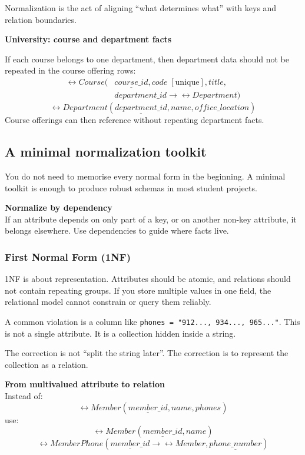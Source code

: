Normalization is the act of aligning “what determines what” with keys and relation boundaries.

\begin{examplebox}
\textbf{University: course and department facts}\par\smallskip
If each course belongs to one department, then department data should not be repeated in the course offering rows:
\[
\begin{aligned}
\rel{Course}(&\underline{course\_id}, code \;[\text{unique}], title, \\
&department\_id \rightarrow \rel{Department})
\end{aligned}
\]
\[
\rel{Department}(\underline{department\_id}, name, office\_location)
\]
Course offerings can then reference  without repeating department facts.
\end{examplebox}

\subsection{A minimal normalization toolkit}
You do not need to memorise every normal form in the beginning.
A minimal toolkit is enough to produce robust schemas in most student projects.

\begin{principlebox}
\textbf{Normalize by dependency}\\
If an attribute depends on only part of a key, or on another non-key attribute, it belongs elsewhere.
Use dependencies to guide where facts live.
\end{principlebox}

\subsubsection{First Normal Form (1NF)}
1NF is about representation.
Attributes should be atomic, and relations should not contain repeating groups.
If you store multiple values in one field, the relational model cannot constrain or query them reliably.

A common violation is a column like \texttt{phones = "912..., 934..., 965..."}.
This is not a single attribute.
It is a collection hidden inside a string.

The correction is not “split the string later”.
The correction is to represent the collection as a relation.

\begin{examplebox}
\textbf{From multivalued attribute to relation}\\[2pt]
Instead of:
\[
\rel{Member}(\underline{member\_id}, name, phones)
\]
use:
\[
\rel{Member}(\underline{member\_id}, name)
\]
\[
\rel{MemberPhone}(\underline{member\_id} \rightarrow \rel{Member}, \underline{phone\_number})
\]
\end{examplebox}

